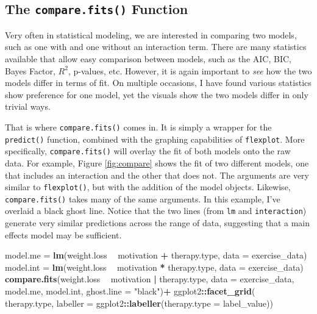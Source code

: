 \documentclass[
  man]{apa6}
\newenvironment{Shaded}{\begin{snugshade}}{\end{snugshade}}
\newcommand{\DataTypeTok}[1]{\textcolor[rgb]{0.13,0.29,0.53}{#1}}
\newcommand{\KeywordTok}[1]{\textcolor[rgb]{0.13,0.29,0.53}{\textbf{#1}}}
\newcommand{\NormalTok}[1]{#1}
\newcommand{\OperatorTok}[1]{\textcolor[rgb]{0.81,0.36,0.00}{\textbf{#1}}}
\newcommand{\StringTok}[1]{\textcolor[rgb]{0.31,0.60,0.02}{#1}}
\begin{document}
\hypertarget{the-compare.fits-function}{%
\subsection{\texorpdfstring{The \texttt{compare.fits()} Function}{The compare.fits() Function}}\label{the-compare.fits-function}}

Very often in statistical modeling, we are interested in comparing two models, such as one with and one without an interaction term. There are many statistics available that allow easy comparison between models, such as the AIC, BIC, Bayes Factor, \(R^2\), p-values, etc. However, it is again important to \emph{see} how the two models differ in terms of fit. On multiple occasions, I have found various statistics show preference for one model, yet the visuals show the two models differ in only trivial ways.

That is where \texttt{compare.fits()} comes in. It is simply a wrapper for the \texttt{predict()} function, combined with the graphing capabilities of \texttt{flexplot}. More specifically, \texttt{compare.fits()} will overlay the fit of both models onto the raw data. For example, Figure \ref{fig:compare} shows the fit of two different models, one that includes an interaction and the other that does not. The arguments are very similar to \texttt{flexplot()}, but with the addition of the model objects. Likewise, \texttt{compare.fits()} takes many of the same arguments. In this example, I've overlaid a black ghost line. Notice that the two lines (from \texttt{lm} and \texttt{interaction}) generate very similar predictions across the range of data, suggesting that a main effects model may be sufficient.

\begin{Shaded}
\begin{Highlighting}[]
\NormalTok{model.me =}\StringTok{ }\KeywordTok{lm}\NormalTok{(weight.loss }\OperatorTok{~}\StringTok{ }\NormalTok{motivation }\OperatorTok{+}\StringTok{ }\NormalTok{therapy.type, }\DataTypeTok{data =}\NormalTok{ exercise_data)}
\NormalTok{model.int =}\StringTok{ }\KeywordTok{lm}\NormalTok{(weight.loss }\OperatorTok{~}\StringTok{ }\NormalTok{motivation }\OperatorTok{*}\StringTok{ }\NormalTok{therapy.type, }\DataTypeTok{data =}\NormalTok{ exercise_data)}
\KeywordTok{compare.fits}\NormalTok{(weight.loss }\OperatorTok{~}\StringTok{ }\NormalTok{motivation }\OperatorTok{|}\StringTok{ }\NormalTok{therapy.type, }
             \DataTypeTok{data =}\NormalTok{ exercise_data, model.me, model.int, }\DataTypeTok{ghost.line =} \StringTok{"black"}\NormalTok{)}\OperatorTok{+}
\StringTok{      }\NormalTok{ggplot2}\OperatorTok{::}\KeywordTok{facet_grid}\NormalTok{( }\OperatorTok{~}\StringTok{ }\NormalTok{therapy.type, }
          \DataTypeTok{labeller =}\NormalTok{ ggplot2}\OperatorTok{::}\KeywordTok{labeller}\NormalTok{(}\DataTypeTok{therapy.type =}\NormalTok{ label_value))}
\end{Highlighting}
\end{Shaded}
\end{document}
